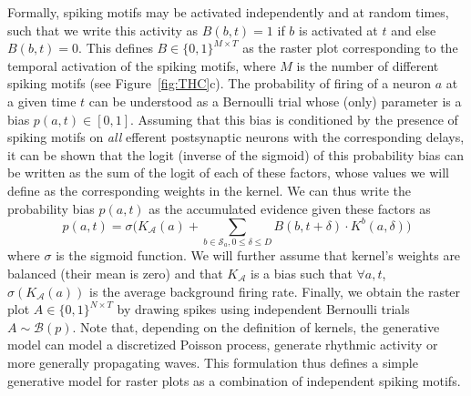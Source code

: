 \documentclass[runningheads]{llncs}
\newcommand{\presynaddr}{a} %
\newcommand{\postsynaddr}{b} %
\newcommand{\presynaddrspace}{\mathcal{A}} %
\newcommand{\synapse}{\mathcal{S}} %
\newcommand{\synapticdelay}{\delta} %
\newcommand{\kernel}{K} %
\begin{document}
Formally, spiking motifs may be activated independently and at random times, such that we write this activity as $B(\postsynaddr, t)=1$ if $b$ is activated at $t$ and else $B(\postsynaddr, t)=0$. This defines $B\in \{0, 1\}^{M\times T}$ as the raster plot corresponding to the temporal activation of the spiking motifs, where $M$ is the number of different spiking motifs (see Figure~\ref{fig:THC}c). The probability of firing of a neuron $a$ at a given time $t$ can be understood as a Bernoulli trial whose (only) parameter is a bias $p(\presynaddr, t) \in [0, 1]$. Assuming that this bias is conditioned by the presence of spiking motifs on \emph{all} efferent postsynaptic neurons with the corresponding delays, it can be shown that the logit (inverse of the sigmoid) of this probability bias can be written as the sum of the logit of each of these factors, whose values we will define as the corresponding weights in the kernel. We can thus write the probability bias $p(a, t)$ as the accumulated evidence given these factors as 
\begin{equation*}
p(\presynaddr, t) = \sigma\big(\kernel_\presynaddrspace(\presynaddr) + \sum_{\postsynaddr \in \synapse_\presynaddr, 0 \le \synapticdelay \le D} B(\postsynaddr, t+\synapticdelay) \cdot \kernel^\postsynaddr(\presynaddr, \synapticdelay) \big)  
\end{equation*}
where $\sigma$ is the sigmoid function. We will further assume that kernel's weights are balanced (their mean is zero) and that $\kernel_\presynaddrspace$ is a bias such that $\forall \presynaddr, t$, $\sigma(\kernel_\presynaddrspace(\presynaddr))$ is the average background firing rate. 
Finally, we obtain the raster plot $A\in \{0, 1\}^{N\times T}$ by drawing spikes using independent Bernoulli trials $A \sim \mathcal{B}(p)$. Note that, depending on the definition of kernels, the generative model can model a discretized Poisson process, generate rhythmic activity or more generally propagating waves. This formulation thus defines a simple generative model for raster plots as a combination of independent spiking motifs. 
%
\end{document}
